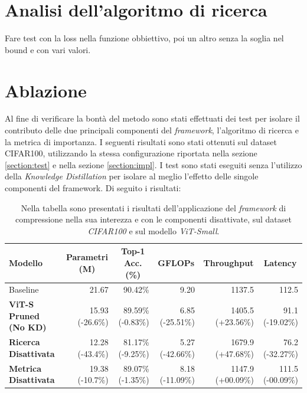 \section{Analisi dell'algoritmo di ricerca}
Fare test con la loss nella funzione obbiettivo, poi un altro senza la soglia
nel bound e con vari valori.

\section{Ablazione}
Al fine di verificare la bontà del metodo sono stati effettuati dei test per isolare il contributo delle due principali componenti del \textit{framework}, l'algoritmo di ricerca e la metrica di importanza. \newline
I seguenti risultati sono stati ottenuti sul dataset CIFAR100, utilizzando la stessa configurazione riportata nella sezione \ref{section:test} e nella sezione \ref{section:impl}. I test sono stati eseguiti senza l'utilizzo della \textit{Knowledge Distillation} per isolare al meglio l'effetto delle singole componenti del framework. \newline
Di seguito i risultati: \newline 
\begin{table}[ht]
    \centering
    \label{tab:risultati-ablazione}
    \footnotesize 
    \setlength{\tabcolsep}{3pt} 
    \begin{tabular}{@{} l r r r r r @{}}
        \toprule
        \textbf{Modello} & \multicolumn{1}{c}{\textbf{Parametri (M)}} & \multicolumn{1}{c}{\textbf{Top-1 Acc. (\%)}} & \multicolumn{1}{c}{\textbf{GFLOPs}} & \multicolumn{1}{c}{\textbf{Throughput}} & \multicolumn{1}{c}{\textbf{Latency}} \\ \midrule
        Baseline           & 21.67 \hphantom{(-00.0\%)}        & 90.42\% \hphantom{(-0.00\%)}        & 9.20 \hphantom{(-00.00\%)}        & 1137.5 \hphantom{(+00.00\%)}        & 112.5 \hphantom{(-00.00\%)}       \\
        \midrule
        \textbf{ViT-S Pruned (No KD)}    & 15.93 (-26.6\%) & 89.59\% (-0.83\%) & 6.85 (-25.51\%) & 1405.5 (+23.56\%) & 91.1 (-19.02\%) \\
        \midrule
        \textbf{Ricerca Disattivata} & 12.28 (-43.4\%) & 81.17\% (-9.25\%) & 5.27 (-42.66\%) & 1679.9 (+47.68\%) & 76.2 (-32.27\%) \\
        \midrule
        \textbf{Metrica Disattivata} & 19.38 (-10.7\%) & 89.07\% (-1.35\%) & 8.18 (-11.09\%) & 1147.9 (+00.09\%) & 111.5 (-00.09\%) \\
        \bottomrule
    \end{tabular}
    \vspace{10pt}
    \caption{Nella tabella sono presentati i risultati dell'applicazione del \textit{framework} di compressione nella sua interezza e con le componenti disattivate, sul dataset \textit{CIFAR100} e sul modello \textit{ViT-Small}.}
\end{table}

